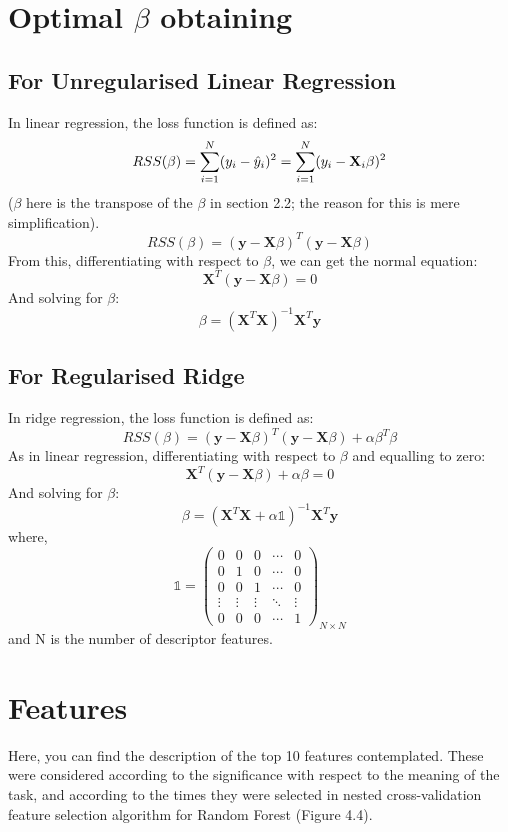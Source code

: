 \section*{Optimal $\beta$ obtaining}



\subsection*{For Unregularised Linear Regression}
In linear regression, the loss function is defined as:
$$
    RSS(\beta)=\sum_{i=1}^N(y_i-\hat{y}_i)^2=\sum_{i=1}^N(y_i-\textbf{X}_i\beta )^2\\
$$
($\beta$ here is the transpose of the $\beta$ in section 2.2; the reason for this is mere simplification).
$$
    RSS(\beta)=(\textbf{y}-\textbf{X}\beta)^T(\textbf{y}-\textbf{X}\beta)
$$
From this, differentiating with respect to $\beta$, we can get the normal equation:
$$
\textbf{X}^T(\textbf{y}-\textbf{X}\beta)=0
$$
And solving for $\beta$:
\begin{equation}
    \beta=(\textbf{X}^T\textbf{X})^{-1}\textbf{X}^T\textbf{y}
\end{equation}
\subsection*{For Regularised Ridge}
In ridge regression, the loss function is defined as:
$$
 RSS(\beta)=(\textbf{y}-\textbf{X}\beta)^T(\textbf{y}-\textbf{X}\beta)+\alpha\beta^T\beta
$$
As in linear regression, differentiating with respect to $\beta$ and equalling to zero:
$$
\textbf{X}^T(\textbf{y}-\textbf{X}\beta)+\alpha\beta=0
$$
And solving for $\beta$:
$$
\beta=(\textbf{X}^T\textbf{X}+\alpha\mathbb{1})^{-1}\textbf{X}^T\textbf{y}
$$
where,
\begin{equation}
   \mathbb{1} =
    \begin{pmatrix}
0 & 0 & 0 & \cdots & 0\\
0 & 1 & 0 & \cdots & 0\\
0 & 0 & 1 & \cdots & 0\\
\vdots & \vdots & \vdots & \ddots & \vdots\\
0 & 0 & 0 & \cdots & 1
\end{pmatrix}_{N \times N}
\end{equation}
and N is the number of descriptor features.

\section*{Features}
Here, you can find the description of the top 10 features contemplated. These were considered according to the significance with respect to the meaning of the task, and according to the times they were selected in nested cross-validation feature selection algorithm for Random Forest (Figure 4.4).

